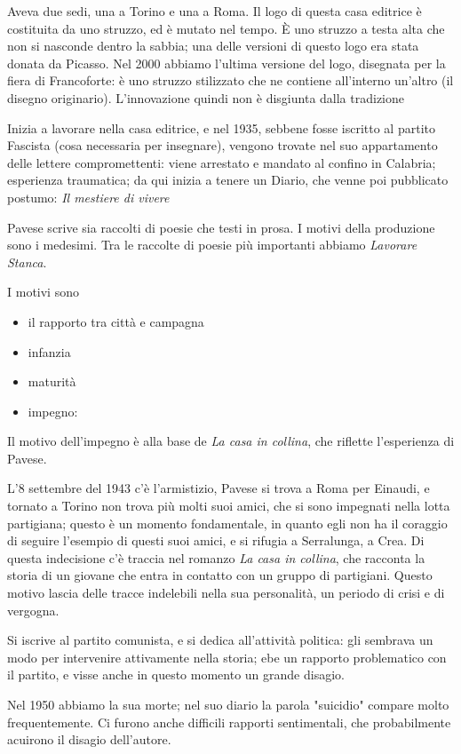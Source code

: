 \documentclass[a4paper, twoside, titlepage]{book}
\newcommand{\elenco}[1]{%
\begin{itemize}
#1
\end{itemize}}
\begin{document}
Aveva due sedi, una a Torino e una a Roma. Il logo di questa casa editrice è costituita da uno struzzo, ed è mutato nel tempo. È uno struzzo a testa alta che non si nasconde dentro la sabbia; una delle versioni di questo logo era stata donata da Picasso.
Nel 2000 abbiamo l'ultima versione del logo, disegnata per la fiera di Francoforte: è uno struzzo stilizzato che ne contiene all'interno un'altro (il disegno originario). L'innovazione quindi non è disgiunta dalla tradizione

\vspace{1em}

Inizia a lavorare nella casa editrice, e nel 1935, sebbene fosse iscritto al partito Fascista (cosa necessaria per insegnare), vengono trovate nel suo appartamento delle lettere compromettenti: viene arrestato e mandato al confino in Calabria; esperienza traumatica; da qui inizia a tenere un Diario, che venne poi pubblicato postumo: \textit{Il mestiere di vivere}

Pavese scrive sia raccolti di poesie che testi in prosa. I motivi della produzione sono i medesimi. Tra le raccolte di poesie più importanti abbiamo \textit{Lavorare Stanca}.

I motivi sono
\elenco{\item il rapporto tra città e campagna\item infanzia\item maturità\item impegno: }

Il motivo dell'impegno è alla base de \textit{La casa in collina}, che riflette l'esperienza di Pavese.

L'8 settembre del 1943 c'è l'armistizio, Pavese si trova a Roma per Einaudi, e tornato a Torino non trova più molti suoi amici, che si sono impegnati nella lotta partigiana; questo è un momento fondamentale, in quanto egli non ha il coraggio di seguire l'esempio di questi suoi amici, e si rifugia a Serralunga, a Crea. Di questa indecisione c'è traccia nel romanzo \textit{La casa in collina}, che racconta la storia di un giovane che entra in contatto con un gruppo di partigiani.
Questo motivo lascia delle tracce indelebili nella sua personalità, un periodo di crisi e di vergogna.

Si iscrive al partito comunista, e si dedica all'attività politica: gli sembrava un modo per intervenire attivamente nella storia; ebe un rapporto problematico con il partito, e visse anche in questo momento un grande disagio.

Nel 1950 abbiamo la sua morte; nel suo diario la parola "suicidio" compare molto frequentemente. Ci furono anche difficili rapporti sentimentali, che probabilmente acuirono il disagio dell'autore.
\end{document}
